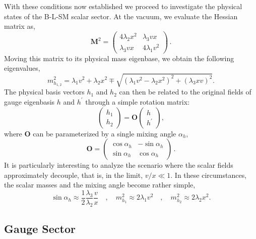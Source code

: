 \documentclass[10pt]{report}
\begin{document}
With these conditions now established we proceed to investigate the physical states of the B-L-SM scalar sector. 
%
At the vacuum, we evaluate the Hessian matrix as,
\begin{equation}
\mathbf{M}^2 =
\begin{pmatrix}
4 \lambda_2 x^2 & \lambda_3 v x \\ 
\lambda_3 v x   & 4 \lambda_1 v^2 
\end{pmatrix}\,.
\label{eq:hess}
\end{equation}
% 
Moving this matrix to its physical mass eigenbase, we obtain the following eigenvalues,
%
\begin{equation}
m_{h_{1,2}}^2 = \lambda_1 v^2 + \lambda_2 x^2 \mp \sqrt{(\lambda_1 v^2 - \lambda_2 x^2)^2 + (\lambda_3 x v)^2}.
\label{eq:eigvals}
\end{equation} 
%
The physical basis vectors $h_1$ and $h_2$ can then be related to the original fields of gauge eigenbasis $h$ and $h^\prime$ through a simple rotation matrix:
%
\begin{equation}
\begin{pmatrix}
h_1 \\
h_2 
\end{pmatrix}
=
\mathbf{O}
\begin{pmatrix}
h \\
h^\prime 
\end{pmatrix},
\label{eq:trans}
\end{equation}
%
where $\mathbf{O}$ can be parameterized by a single mixing angle $\alpha_h$,
%
\begin{equation}
\mathbf{O} = 
\begin{pmatrix}
\cos \alpha_h & -\sin \alpha_h \\
\sin \alpha_h & \cos \alpha_h 
\end{pmatrix}\,.
\label{eq:rotmat}
\end{equation}
%
It is particularly interesting to analyze the scenario where the scalar fields approximately decouple, that is, in the limit, $v/x\ll 1$. In these circumstances, the scalar masses and the mixing angle become rather simple,
\begin{equation}
\sin \alpha_h \approx \dfrac{1}{2}\dfrac{\lambda_3}{\lambda_2} \dfrac{v}{x} \quad , \quad 
m_{h_1}^2 \approx 2 \lambda_1 v^2 \quad , \quad m_{h_2}^2 \approx 2 \lambda_2 x^2
\label{eq:simplify} .
\end{equation}

\subsection{Gauge Sector}
\end{document}
